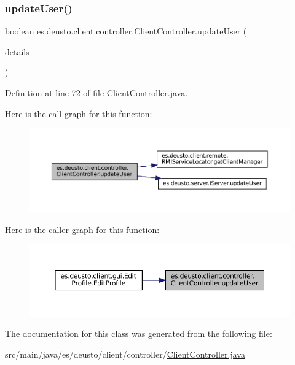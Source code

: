 \subsubsection{\texorpdfstring{updateUser()}{updateUser()}}
{\footnotesize\ttfamily boolean es.\+deusto.\+client.\+controller.\+Client\+Controller.\+update\+User (\begin{DoxyParamCaption}\item[{\mbox{\hyperlink{classes_1_1deusto_1_1server_1_1data_1_1_user_details_d_t_o}{User\+Details\+D\+TO}}}]{details }\end{DoxyParamCaption})}



Definition at line 72 of file Client\+Controller.\+java.

Here is the call graph for this function\+:
\nopagebreak
\begin{figure}[H]
\begin{center}
\leavevmode
\includegraphics[width=350pt]{classes_1_1deusto_1_1client_1_1controller_1_1_client_controller_ad1a2384c7c7f73d40d8d50c4bf77be7d_cgraph}
\end{center}
\end{figure}
Here is the caller graph for this function\+:
\nopagebreak
\begin{figure}[H]
\begin{center}
\leavevmode
\includegraphics[width=350pt]{classes_1_1deusto_1_1client_1_1controller_1_1_client_controller_ad1a2384c7c7f73d40d8d50c4bf77be7d_icgraph}
\end{center}
\end{figure}


The documentation for this class was generated from the following file\+:\begin{DoxyCompactItemize}
\item 
src/main/java/es/deusto/client/controller/\mbox{\hyperlink{_client_controller_8java}{Client\+Controller.\+java}}\end{DoxyCompactItemize}
